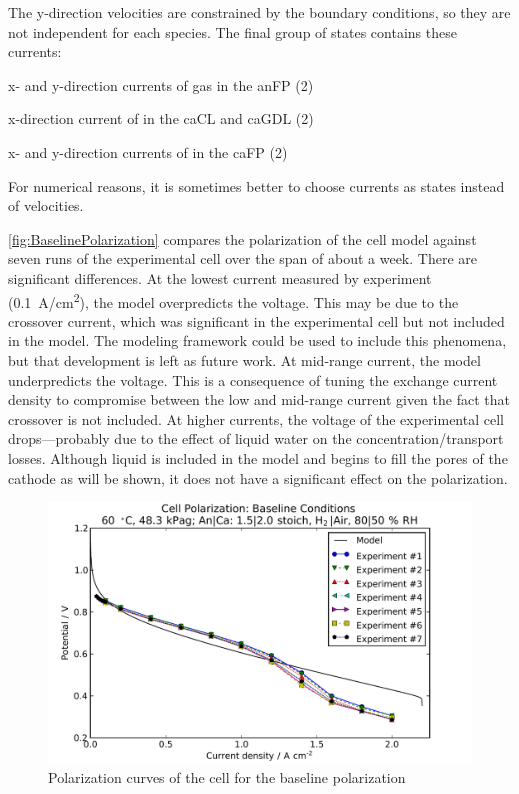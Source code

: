 The y-direction velocities are constrained by the boundary conditions, so they are not independent for each species.  The final group of states contains these currents:
\begin{enumerate*}
  \item x- and y-direction currents of  gas in the anFP (2)
  \item x-direction current of  in the caCL and caGDL (2)
  \item x- and y-direction currents of  in the caFP (2)
\end{enumerate*}
For numerical reasons, it is sometimes better to choose currents as states instead of velocities.

\autoref{fig:BaselinePolarization} compares the polarization of the cell model against seven runs of the experimental cell over the span of about a week.  There are significant differences.  At the lowest current measured by experiment (\SI{0.1}{A/cm^2}), the model overpredicts the voltage.  This may be due to the  crossover current, which was significant in the experimental cell but not included in the model.  The modeling framework could be used to include this phenomena, but that development is left as future work.  At mid-range current, the model underpredicts the voltage.  This is a consequence of tuning the exchange current density to compromise between the low and mid-range current given the fact that  crossover is not included.  At higher currents, the voltage of the experimental cell drops---probably due to the effect of liquid water on the concentration\slash{}transport losses.  Although liquid is included in the model and begins to fill the pores of the cathode  as will be shown, it does not have a significant effect on the polarization.

\begin{figure}[htbp]
  \includegraphics[width=\linewidth]{Results/Cell/Model/Baseline/Polarization}%
  \caption{Polarization curves of the cell for the baseline polarization}%
  \label{fig:BaselinePolarization}
\end{figure}

